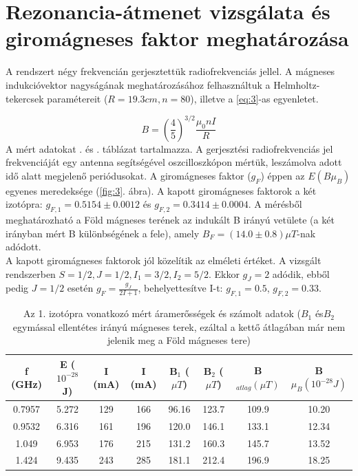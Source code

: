 \documentclass[12pt]{article}
\theoremstyle{plain}
\begin{document}
%
\section{Rezonancia-átmenet vizsgálata \newline és giromágneses faktor meghatározása}
A rendszert négy frekvencián gerjesztettük radiofrekvenciás jellel. A mágneses indukcióvektor nagyságának meghatározásához felhasználtuk a Helmholtz-tekercsek paramétereit ($R = 19.3 cm, n = 80$), illetve a \ref{eq:3}-as egyenletet.

\begin{equation}
\label{eq:3}
B = \left(\frac{4}{5}\right)^{3/2} \frac{\mu_0nI}{R}
\end{equation}
A mért adatokat . és  . táblázat tartalmazza. A gerjesztési radiofrekvenciás jel frekvenciáját egy antenna segítségével oszcilloszkópon mértük, leszámolva adott idő alatt megjelenő periódusokat. A giromágneses faktor ($g_F$) éppen az $E(B\mu_B)$ egyenes meredeksége (\ref{fig:3}. ábra). A kapott giromágneses faktorok a két izotópra: $g_{F,1} = 0.5154 \pm 0.0012$ és $g_{F,2} = 0.3414 \pm 0.0004$.
A mérésből meghatározható a Föld mágneses terének az indukált B irányú vetülete (a két irányban mért B különbségének a fele), amely $B_{F} = (14.0\pm 0.8 )\mu T $-nak adódott.
\\ A kapott giromágneses faktorok jól közelítik az elméleti értéket. A vizsgált rendszerben $S = 1/2, J = 1/2, I_1 = 3/2, I_2 = 5/2$. Ekkor $g_J = 2$ adódik, ebből pedig $J=1/2$ esetén $g_F = \frac{g_J}{2I+1}$, behelyettesítve I-t: $g_{F,1} = 0.5$, $g_{F,2} = 0.33$.
\begin{table}[H]
\begin{tabular}{|c|c|c|c|c|c|c|c|} \hline
f (GHz) & E ($10^{-28}$J) & I (mA) & I (mA) & B$_1$ ($\mu T$) & B$_2$ ($\mu T$) &B$_{atlag} (\mu T)$& B$\mu_B (10^{-28} J)$ \\ \hline
0.7957 & 5.272 & 129 & 166 & 96.16 & 123.7 &109.9 & 10.20 \\ \hline
0.9532 &	6.316&	161&	196&	120.0&	146.1	&133.1& 12.34 \\ \hline
1.049&	6.953&	176&	215&	131.2&	160.3	&145.7&   13.52\\ \hline
1.424	&9.435&	243	&285	 &181.1&	212.4&	196.9&		18.25\\
\hline
\end{tabular}
\caption{Az 1. izotópra vonatkozó mért áramerősségek és számolt adatok ($B_1$ és$B_2$ egymással ellentétes irányú mágneses terek, ezáltal a kettő átlagában már nem jelenik meg a Föld mágneses tere)}
\label{tab:3}
\end{table}
\end{document}
